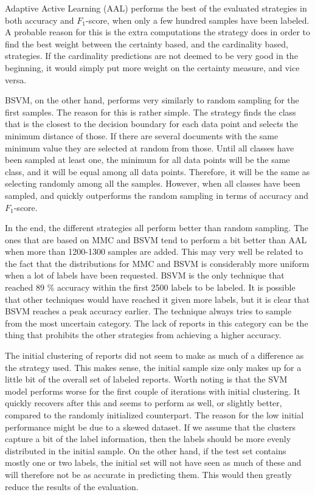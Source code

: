 Adaptive Active Learning (AAL) performs the best of the evaluated strategies in both accuracy and $F_1$-score, when only a few hundred samples have been labeled. 
A probable reason for this is the extra computations the strategy does in order to find the best weight between the certainty based, and the cardinality based, strategies.
If the cardinality predictions are not deemed to be very good in the beginning, it would simply put more weight on the certainty measure, and vice versa.

BSVM, on the other hand, performs very similarly to random sampling for the first samples.
The reason for this is rather simple.
The strategy finds the class that is the closest to the decision boundary for each data point and selects the minimum distance of those.
If there are several documents with the same minimum value they are selected at random from those.
Until all classes have been sampled at least one, the minimum for all data points will be the same class, and it will be equal among all data points.
Therefore, it will be the same as selecting randomly among all the samples.
However, when all classes have been sampled, and quickly outperforms the random sampling in terms of accuracy and $F_1$-score.

In the end, the different strategies all perform better than random sampling.
The ones that are based on MMC and BSVM tend to perform a bit better than AAL when more than 1200-1300 samples are added.
This may very well be related to the fact that the distributions for MMC and BSVM is considerably more uniform when a lot of labels have been requested.
BSVM is the only technique that reached 89 \% accuracy within the first 2500 labels to be labeled.
It is possible that other techniques would have reached it given more labels, but it is clear that BSVM reaches a peak accuracy earlier.
The technique always tries to sample from the most uncertain category.
The lack of reports in this category can be the thing that prohibits the other strategies from achieving a higher accuracy.

The initial clustering of reports did not seem to make as much of a difference as the strategy used.
This makes sense, the initial sample size only makes up for a little bit of the overall set of labeled reports.
Worth noting is that the SVM model performs worse for the first couple of iterations with initial clustering.
It quickly recovers after this and seems to perform as well, or slightly better, compared to the randomly initialized counterpart.
The reason for the low initial performance might be due to a skewed dataset.
If we assume that the clusters capture a bit of the label information, then the labels should be more evenly distributed in the initial sample.
On the other hand, if the test set contains mostly one or two labels, the initial set will not have seen as much of these and will therefore not be as accurate in predicting them.
This would then greatly reduce the results of the evaluation.

